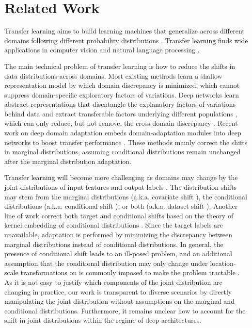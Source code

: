 \documentclass{article}
\begin{document}
\section{Related Work}
Transfer learning \cite{cite:TKDE10TLSurvey} aims to build learning machines that generalize across different domains following different probability distributions \cite{cite:NIPS08CSA,cite:TNN11TCA,cite:TPAMI12DTMKL,cite:ICML13Landmark,cite:ICML13TCS}. Transfer learning finds wide applications in computer vision \cite{cite:ECCV10Office,cite:ICCV11GFS,cite:CVPR12GFK,cite:NIPS14LSDA} and natural language processing \cite{cite:JMLR11MTLNLP,cite:ICML11DADL}. 

The main technical problem of transfer learning is how to reduce the shifts in data distributions across domains. Most existing methods learn a shallow representation model by which domain discrepancy is minimized, which cannot suppress domain-specific exploratory factors of variations. Deep networks learn abstract representations that disentangle the explanatory factors of variations behind data \cite{cite:TPAMI13DLSurvey} and extract transferable factors underlying different populations \cite{cite:ICML11DADL,cite:CVPR13MidLevel}, which can only reduce, but not remove, the cross-domain discrepancy \cite{cite:NIPS14CNN}. Recent work on deep domain adaptation embeds domain-adaptation modules into deep networks to boost transfer performance \cite{cite:Arxiv14DDC,cite:ICCV15SDT,cite:arXiv17ADDA,cite:ICML15RevGrad,cite:ICML15DAN,cite:NIPS16RTN}. These methods mainly correct the shifts in marginal distributions, assuming conditional distributions remain unchanged after the marginal distribution adaptation.

Transfer learning will become more challenging as domains may change by the joint distributions  of input features  and output labels . The distribution shifts may stem from the marginal distributions  (a.k.a. covariate shift \cite{cite:NIPS06KMM,cite:NIPS08CSA}), the conditional distributions  (a.k.a. conditional shift \cite{cite:ICML13TCS}), or both (a.k.a. dataset shift \cite{cite:Book09DSS}). Another line of work \cite{cite:ICML13TCS,cite:NIPS14FTL} correct both target and conditional shifts based on the theory of kernel embedding of conditional distributions \cite{cite:ICML09HSE,cite:ICML10HSE,cite:JMLR10HSE}. Since the target labels are unavailable, adaptation is performed by minimizing the discrepancy between marginal distributions instead of conditional distributions. In general, the presence of conditional shift leads to an ill-posed problem, and an additional assumption that the conditional distribution may only change under location-scale transformations on  is commonly imposed to make the problem tractable \cite{cite:ICML13TCS}. As it is not easy to justify which components of the joint distribution are changing in practice, our work is transparent to diverse scenarios by directly manipulating the joint distribution without assumptions on the marginal and conditional distributions. Furthermore, it remains unclear how to account for the shift in joint distributions within the regime of deep architectures.
\end{document}
